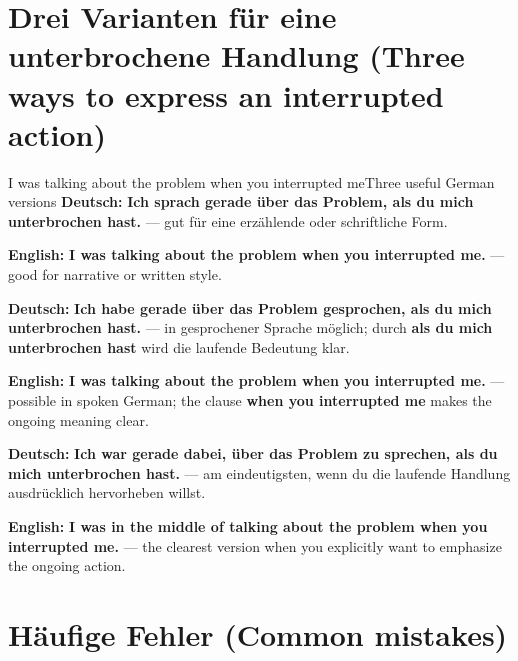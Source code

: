 \documentclass[a4paper,11pt]{article}
\newcommand{\GermanText}[1]{\textbf{Deutsch: }#1\par}
\newcommand{\EnglishText}[1]{{\small\color{SoftGray}\textbf{English: }#1\par}}
\begin{document}
\section{Drei Varianten für eine unterbrochene Handlung \textnormal{(Three ways to express an interrupted action)}}

        \begin{grammarentry}{I was talking about the problem when you interrupted me}{Three useful German versions}
            \GermanText{\textbf{Ich sprach gerade über das Problem, als du mich unterbrochen hast.} --- gut für eine erzählende oder schriftliche Form.}
            \EnglishText{\textbf{I was talking about the problem when you interrupted me.} --- good for narrative or written style.}

            \GermanText{\textbf{Ich habe gerade über das Problem gesprochen, als du mich unterbrochen hast.} --- in gesprochener Sprache möglich; durch \textbf{als du mich unterbrochen hast} wird die laufende Bedeutung klar.}
            \EnglishText{\textbf{I was talking about the problem when you interrupted me.} --- possible in spoken German; the clause \textbf{when you interrupted me} makes the ongoing meaning clear.}

            \GermanText{\textbf{Ich war gerade dabei, über das Problem zu sprechen, als du mich unterbrochen hast.} --- am eindeutigsten, wenn du die laufende Handlung ausdrücklich hervorheben willst.}
            \EnglishText{\textbf{I was in the middle of talking about the problem when you interrupted me.} --- the clearest version when you explicitly want to emphasize the ongoing action.}
        \end{grammarentry}

\section{Häufige Fehler \textnormal{(Common mistakes)}}
\end{document}
